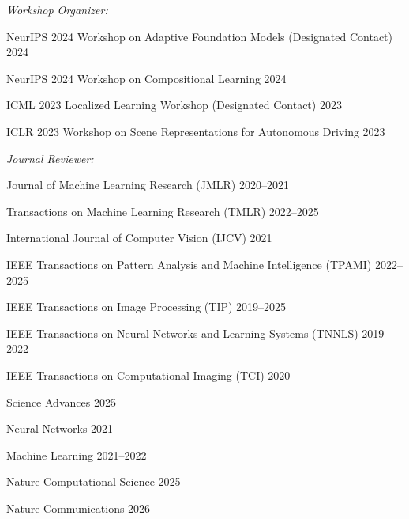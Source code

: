 {\it Workshop Organizer:}
\begin{list2}
\item NeurIPS 2024 Workshop on Adaptive Foundation Models (Designated Contact) \hfill 2024
\item NeurIPS 2024 Workshop on Compositional Learning \hfill 2024
\item ICML 2023 Localized Learning Workshop (Designated Contact) \hfill 2023
\item ICLR 2023 Workshop on Scene Representations for Autonomous Driving \hfill 2023
\end{list2}

{\it Journal Reviewer:}
\begin{list2}
\item Journal of Machine Learning Research (JMLR) \hfill 2020--2021
\item Transactions on Machine Learning Research (TMLR) \hfill 2022--2025
\item International Journal of Computer Vision (IJCV) \hfill 2021
\item IEEE Transactions on Pattern Analysis and Machine Intelligence (TPAMI) \hfill 2022--2025
\item IEEE Transactions on Image Processing (TIP) \hfill 2019--2025
\item IEEE Transactions on Neural Networks and Learning Systems (TNNLS) \hfill 2019--2022
\item IEEE Transactions on Computational Imaging (TCI) \hfill 2020
\item Science Advances \hfill 2025
\item Neural Networks \hfill 2021
\item Machine Learning \hfill 2021--2022
\item Nature Computational Science \hfill 2025
\item Nature Communications \hfill 2026
\end{list2}

